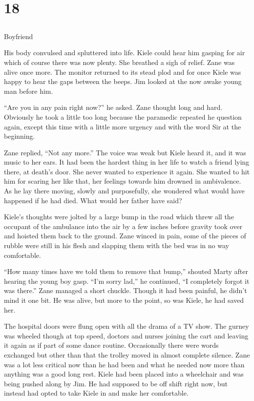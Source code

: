 \chapter{18}
\section{}
Boyfriend  

His body convulsed and spluttered into life.  Kiele could hear him gasping for air which of course there was now plenty.  She breathed a sigh of relief.  Zane was alive once more.  The monitor returned to its stead plod and for once Kiele was happy to hear the gaps between the beeps.  Jim looked at the now awake young man before him.

``Are you in any pain right now?'' he asked.  Zane thought long and hard.  Obviously he took a little too long because the paramedic repeated he question again, except this time with a little more urgency and with the word Sir at the beginning.  

Zane replied, ``Not any more.''  The voice was weak but Kiele heard it, and it was music to her ears.  It had been the hardest thing in her life to watch a friend lying there, at death's door.  She never wanted to experience it again.  She wanted to hit him for scaring her like that, her feelings towards him drowned in ambivalence.   As he lay there moving, slowly and purposefully, she wondered what would have happened if he had died.  What would her father have said?

Kiele's thoughts were jolted by a large bump in the road which threw all the occupant of the ambulance into the air by a few inches before gravity took over and hoisted them back to the ground.  Zane winced in pain, some of the pieces of rubble were still in his flesh and slapping them with the bed was in no way comfortable.  

``How many times have we told them to remove that bump,'' shouted Marty after hearing the young boy gasp.  ``I'm sorry lad,'' he continued, ``I completely forgot it was there.''  Zane managed a short chuckle.  Though it had been painful, he didn't mind it one bit.  He was alive, but more to the point, so was Kiele, he had saved her.



\thoughtbreak



The hospital doors were flung open with all the drama of a TV show.  The gurney was wheeled though at top speed, doctors and nurses joining the cart and leaving it again as if part of some dance routine.  Occasionally there were words exchanged but other than that the trolley moved in almost complete silence.  Zane was a lot less critical now than he had been and what he needed now more than anything was a good long rest.  Kiele had been placed into a wheelchair and was being pushed along by Jim.  He had supposed to be off shift right now, but instead had opted to take Kiele in and make her comfortable.  

